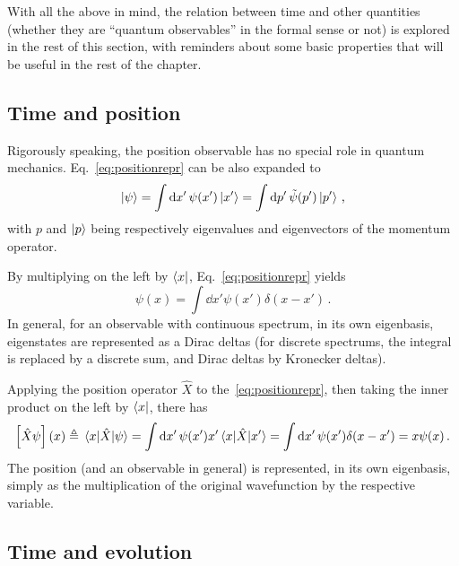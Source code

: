 With all the above in mind, the relation between time and other quantities
(whether they are ``quantum observables'' in the formal sense or not)
is explored in the rest of this section,
with reminders about some basic properties that will be useful in the rest of the
chapter.

\subsection{Time and position}

Rigorously speaking, the position observable has no special role in quantum mechanics.
Eq.~\eqref{eq:positionrepr} can be also expanded to
\begin{equation}\label{eq:qprepr}
  \ket{\psi} = \int \dd{x'} \psi(x') \ket{x'} = \int \dd{p'} \tilde{\psi}(p') \ket{p'} \,\text{,}
\end{equation}
with $p$ and $\ket{p}$ being respectively eigenvalues and eigenvectors of the momentum operator.

By multiplying on the left by $\bra{x}$, Eq.~\eqref{eq:positionrepr} yields
\begin{equation}\label{eq:diracdeltax}
  \psi(x) = \int \dd{x'} \psi(x') \delta(x-x') \,\text{.}
\end{equation}
In general, for an observable with continuous spectrum,
in its own eigenbasis, eigenstates are represented as a Dirac deltas
(for discrete spectrums, the integral is replaced by a discrete sum,
and Dirac deltas by Kronecker deltas).

Applying the position operator $\hat{X}$ to the~\eqref{eq:positionrepr},
then taking the inner product on the left by $\bra{x}$,
there has
\begin{equation}
  \qty[\hat{X}\psi](x) \triangleq \mel{x}{\hat{X}}{\psi} =
    \int \dd{x'} \psi(x') x' \mel{x}{\hat{X}}{x'} =
    \int \dd{x'} \psi(x') \delta(x-x') =
    x\psi(x)
  \,\text{.}
\end{equation}
The position
(and an observable in general) is represented, in its own eigenbasis,
simply as the multiplication of the original wavefunction by the respective variable.

\subsection{Time and evolution}

